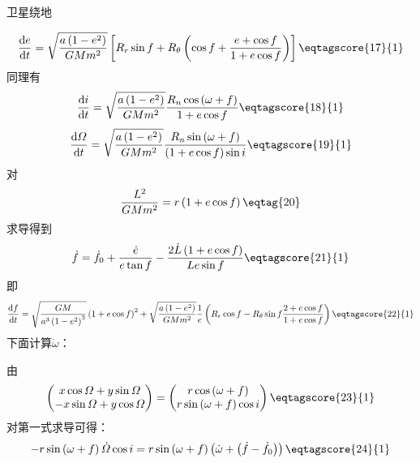 \documentclass[answer]{cphos}
\begin{document}
\begin{problem}[50]{卫星绕地}
\begin{solution}
\begin{equation}
	\frac{\mathrm{d}e}{\mathrm{d}t} = \sqrt{\frac{a\left(1 - e^2\right)}{GMm^2}} \left[R_r \sin f + R_\theta \left(\cos f + \frac{e+\cos f}{1+e\cos f}\right)\right] \eqtagscore{17}{1}  \label{eq:1.2}
\end{equation}
同理有
\begin{equation}
	\frac{\mathrm{d}i}{\mathrm{d}t} =\sqrt{\frac{a\left(1 - e^2\right)}{GMm^2}}\frac{R_n\cos\left(\omega+f\right)}{1+e\cos f}  \eqtagscore{18}{1} \label{eq:1.3}
\end{equation}
\begin{equation}
	\frac{\mathrm{d}\varOmega}{\mathrm{d}t} =\sqrt{\frac{a\left(1 - e^2\right)}{GMm^2}}\frac{R_n\sin\left(\omega+f\right)}{\left(1+e\cos f\right)\sin i}  \eqtagscore{19}{1} \label{eq:1.4}
\end{equation}
对
\begin{equation}
	\frac{L^2}{GMm^2}=r\left(1+e\cos f\right) \eqtag{20} 
\end{equation}
求导得到
\begin{equation}
	\dot{f}=\dot{f}_0 + \frac{\dot{e}}{e \tan f} - \frac{2\dot{L}\left(1+e\cos f\right)}{Le\sin f} \eqtagscore{21}{1}
\end{equation}
即
\begin{equation}
	\frac{\mathrm{d}f}{\mathrm{d}t}=\sqrt{\frac{GM}{a^3\left(1-e^2\right)^3}}\left(1+e\cos f\right)^2+ \sqrt{\frac{a\left(1 - e^2\right)}{GMm^2}}\frac{1}{e}\left(R_r\cos f - R_{\theta}\sin f\frac{2+e\cos f}{1+ e\cos f}\right) 
	\eqtagscore{22}{1} \label{eq:1.5}
\end{equation}
下面计算$\dot{\omega}$：
\begin{multisol}
	\item
	由
	\begin{equation}
		\begin{pmatrix}
			x \cos \varOmega + y \sin \varOmega \\
			-x \sin \varOmega + y \cos \varOmega \\
		\end{pmatrix} = \begin{pmatrix}
			r \cos\left(\omega + f\right) \\
			r \sin\left(\omega + f\right) \cos i \\
		\end{pmatrix} \eqtagscore{23}{1}
	\end{equation}
	对第一式求导可得：
	\begin{equation}
		-r\sin\left(\omega+f\right)\dot{\varOmega} \cos i=r\sin\left(\omega+f\right)\left(\dot{\omega}+\left(\dot{f}-\dot{f}_0\right)\right) \eqtagscore{24}{1}

\end{equation}
\end{multisol}
\end{solution}
\end{problem}
\end{document}
